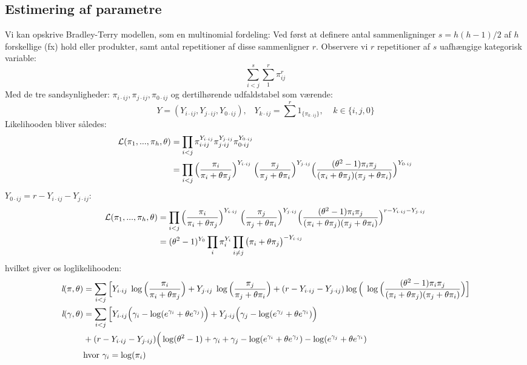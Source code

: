 \documentclass[11pt,a4paper]{article}
\begin{document}
\subsection{Estimering af parametre}
Vi kan opskrive Bradley-Terry modellen, som en multinomial fordeling: Ved først at definere antal sammenligninger $s=h(h-1)/2$ af $h$ forskellige (fx) hold eller produkter, samt antal repetitioner af disse sammenligner $r$. Observere vi $r$ repetitioner af $s$ uafhængige kategorisk variable: $$
\sum_{i<j}^s\sum_1^r\pi_{ij}^r
$$
Med de tre sandsynligheder: $\pi_{i\cdot ij},\pi_{j\cdot ij},\pi_{0\cdot ij}$
og dertilhørende udfaldstabel som værende:
$$
Y=(Y_{i\cdot ij},Y_{j\cdot ij},Y_{0\cdot ij}),\;\;\;Y_{k\cdot ij}=\sum^r1_{\{\pi_{k\cdot ij}\}},\;\;\;\;k\in\{i,j,0\}
$$
Likelihooden bliver således:
\begin{align*}
\mathcal{L}(\pi_1,...,\pi_h,\theta) &= \prod_{i<j}\pi_{i\cdot ij}^{Y_{i\cdot ij}}\pi_{j\cdot ij}^{Y_{j\cdot ij}}\pi_{0\cdot ij}^{Y_{0\cdot ij}}\\
&= \prod_{i<j}\Big{(}\frac{\pi_i}{\pi_i+\theta\pi_j}\Big{)}^{Y_{i\cdot ij}}
\;\Big{(}\frac{\pi_j}{\pi_j+\theta\pi_i}\Big{)}^{Y_{j\cdot ij}}
\Big{(}\frac{(\theta^2-1)\pi_i \pi_j}{(\pi_i+\theta\pi_j)(\pi_j+\theta\pi_i)}\Big{)}^{Y_{0\cdot ij}}\\
\end{align*}
$Y_{0\cdot ij}=r-Y_{i\cdot ij}-Y_{j\cdot ij}$: 
\begin{align}
\mathcal{L}(\pi_1,...,\pi_h,\theta)
&=\prod_{i<j}\Big{(}\frac{\pi_i}{\pi_i+\theta\pi_j}\Big{)}^{Y_{i\cdot ij}}
\;\Big{(}\frac{\pi_j}{\pi_j+\theta\pi_i}\Big{)}^{Y_{j\cdot ij}}
\Big{(}\frac{(\theta^2-1)\pi_i \pi_j}{(\pi_i+\theta\pi_j)(\pi_j+\theta\pi_i)}\Big{)}^{r-{Y_{i\cdot ij}}-{Y_{j\cdot ij}}}\\
&=(\theta^2-1)^{Y_{0}}\prod_i\pi_i^{Y_{i}}\prod_{i\neq j}\big{(}\pi_i+\theta\pi_j\big{)}^{-Y_{i\cdot ij}}
\end{align}
hvilket giver os loglikelihooden: 
\begin{align*}
\textit{l}(\pi,\theta)
&=\sum_{i<j}\Big{[}Y_{i\cdot ij}\;\log\Big{(}\frac{\pi_i}{\pi_i+\theta\pi_j}\Big{)}
+ Y_{j\cdot ij}\;\log\Big{(}\frac{\pi_j}{\pi_j+\theta\pi_i}\Big{)}
+ (r-Y_{i\cdot ij}-Y_{j\cdot ij}) \log \Big{(}\;\log\Big{(}\frac{(\theta^2-1)\pi_i \pi_j}{(\pi_i+\theta\pi_j)(\pi_j+\theta\pi_i)}\Big{)}\Big{]}\\
\textit{l}(\gamma,\theta)
&=\sum_{i<j}\Big{[}Y_{i\cdot ij}\Big{(}\gamma_i-\log(e^{\gamma_i}+\theta e^{\gamma_j})\Big{)}
+Y_{j\cdot ij}\Big{(}\gamma_j-\log(e^{\gamma_j}+\theta e^{\gamma_i})\Big{)}\\
& +(r-Y_{i\cdot ij}-Y_{j\cdot ij}) \Big{(} \log(\theta^2-1)+\gamma_i+\gamma_j-\log(e^{\gamma_i}+\theta e^{\gamma_j})-\log(e^{\gamma_j}+\theta e^{\gamma_i})\\
&\text{hvor }\gamma_i=\log (\pi_i)
\end{align*}
\end{document}
